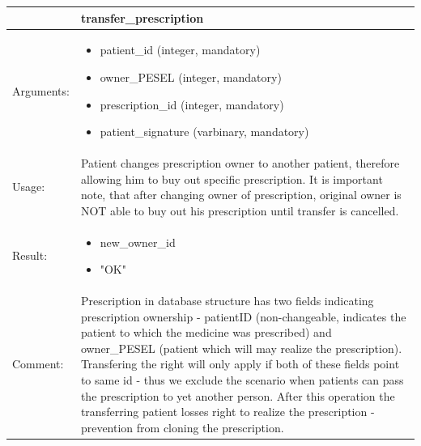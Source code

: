 
    \begin{longtable}{| p{6cm} | p{7.75cm} |}
    \hline
     & transfer\_prescription\\ \hline
    Arguments: &  \begin{itemize}
    	\item patient\_id (integer, mandatory)
    	\item owner\_PESEL (integer, mandatory)
		\item prescription\_id (integer, mandatory)
		\item patient\_signature (varbinary, mandatory)
	\end{itemize}     \\ \hline
    Usage: & Patient changes prescription owner to another patient, therefore allowing him to buy out specific prescription. It is important note, that after changing owner of prescription, original owner is NOT able to buy out his prescription until transfer is cancelled. \\ \hline
    Result: & \begin{itemize}
    	\item new\_owner\_id
		\item "OK"

	\end{itemize}     \\ \hline	
		Comment: & Prescription in database structure has two fields indicating prescription ownership - patientID (non-changeable, indicates the patient to which the medicine was prescribed) and owner\_PESEL (patient which will may realize the prescription).
		Transfering the right will only apply if both of these fields point to same id - thus we exclude the scenario when patients can pass the prescription to yet another person. After this operation the transferring patient losses right to realize the prescription - prevention from cloning the prescription.\\ \hline
    \end{longtable}




